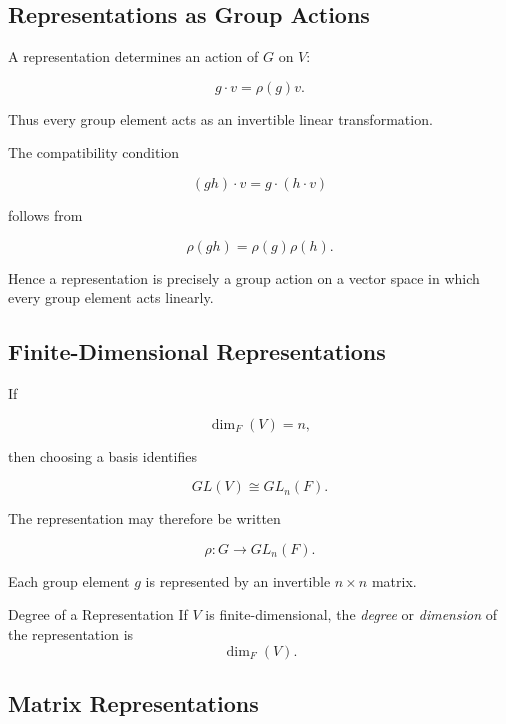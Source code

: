 \subsection{Representations as Group Actions}
\label{subsec:representations-as-actions}

A representation determines an action of \(G\) on \(V\):

\[ g\cdot v=\rho(g)v. \]

Thus every group element acts as an invertible linear transformation.

The compatibility condition

\[ (gh)\cdot v=g\cdot(h\cdot v) \]

follows from

\[ \rho(gh)=\rho(g)\rho(h). \]

Hence a representation is precisely a group action on a vector space in
which every group element acts linearly.

\subsection{Finite-Dimensional Representations}
\label{subsec:finite-dimensional-representations}

If

\[ \dim_F(V)=n, \]

then choosing a basis identifies

\[ GL(V)\cong GL_n(F). \]

The representation may therefore be written

\[ \rho:G\to GL_n(F). \]

Each group element \(g\) is represented by an invertible \(n\times n\)
matrix.

\begin{definitionbox}{Degree of a Representation}
If \(V\) is finite-dimensional, the \emph{degree} or \emph{dimension} of the
representation is
\[ \dim_F(V). \]
\end{definitionbox}

\subsection{Matrix Representations}
\label{subsec:matrix-representations}

